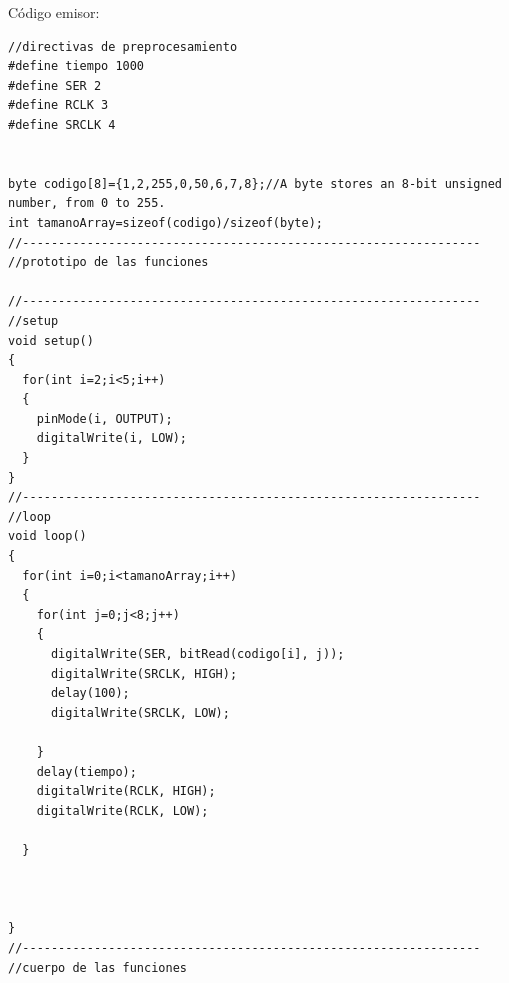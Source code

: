 \documentclass{article}
\begin{document}
Código emisor:
\begin{lstlisting}[style=myArduino]
//directivas de preprocesamiento
#define tiempo 1000
#define SER 2
#define RCLK 3
#define SRCLK 4


byte codigo[8]={1,2,255,0,50,6,7,8};//A byte stores an 8-bit unsigned number, from 0 to 255.
int tamanoArray=sizeof(codigo)/sizeof(byte);
//----------------------------------------------------------------
//prototipo de las funciones

//----------------------------------------------------------------
//setup
void setup()
{
  for(int i=2;i<5;i++)
  {
    pinMode(i, OUTPUT);
    digitalWrite(i, LOW);
  }
}
//----------------------------------------------------------------
//loop
void loop()
{
  for(int i=0;i<tamanoArray;i++)
  {
    for(int j=0;j<8;j++)
    {
      digitalWrite(SER, bitRead(codigo[i], j));
      digitalWrite(SRCLK, HIGH);
      delay(100);
      digitalWrite(SRCLK, LOW);

    }
    delay(tiempo);
    digitalWrite(RCLK, HIGH);
    digitalWrite(RCLK, LOW);
    
  }
  
  
  
}
//----------------------------------------------------------------
//cuerpo de las funciones
\end{lstlisting}
\end{document}
